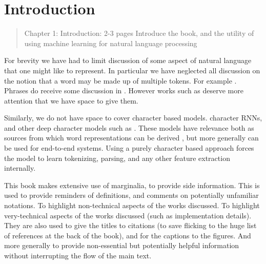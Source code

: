 \documentclass[12pt,parskip]{komatufte}
\begin{document}

\chapter{Introduction}\label{sec:introduction}
\begin{abstract}
	Chapter 1: Introduction: 2-3 pages
	Introduce the book, and the utility of using machine learning for natural language processing
\end{abstract}


For brevity we have had to limit discussion of some aspect of natural language that one might like to represent.
In particular we have neglected all discussion on the notion that a word may be made up of multiple tokens.
For example .
Phrases do receive some discussion in .
However works such as  deserve more attention that we have space to give them.

Similarly, we do not have space to cover character based models.
character RNNs, and other deep character models such as .
These models have relevance both as sources from which word representations can be derived ,
but more generally can be used for end-to-end systems.
Using a purely character based approach forces the model to learn tokenizing, parsing, and any other feature extraction internally.



This book makes extensive use of marginalia, to provide side information.
This is used to provide reminders of definitions, and comments on potentially unfamiliar notations.
To highlight non-technical aspects of the works discussed.
To highlight very-technical aspects of the works discussed (such as implementation details).
They are also used to give the titles to citations (to save flicking to the huge list of references at the back of the book), and for the captions to the figures.
And more generally to provide non-essential  but potentially helpful information without interrupting the flow of the main text.
\end{document}
